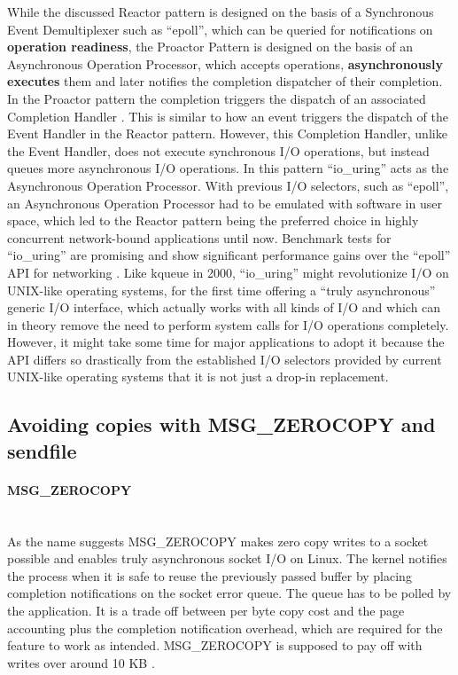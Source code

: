 While the discussed Reactor pattern is designed on the basis of a Synchronous Event Demultiplexer such as “epoll”, which can be queried for notifications on \textbf{operation readiness}, the Proactor Pattern is designed on the basis of an Asynchronous Operation Processor, which accepts operations, \textbf{asynchronously executes} them and later notifies the completion dispatcher of their completion. In the Proactor pattern the completion triggers the dispatch of an associated Completion Handler \cite{schmidt:proactor}. This is similar to how an event triggers the dispatch of the Event Handler in the Reactor pattern. However, this Completion Handler, unlike the Event Handler, does not execute synchronous I/O operations, but instead queues more asynchronous I/O operations. In this pattern “io\_uring” acts as the Asynchronous Operation Processor. With previous I/O selectors, such as “epoll”, an Asynchronous Operation Processor had to be emulated with software in user space, which led to the Reactor pattern being the preferred choice in highly concurrent network-bound applications until now. \newline
Benchmark tests for “io\_uring” are promising and show significant performance gains over the “epoll” API for networking \cite{github:io_uring_bench}. Like kqueue in 2000, “io\_uring” might revolutionize I/O on UNIX-like operating systems, for the first time offering a “truly asynchronous” generic I/O interface, which actually works with all kinds of I/O and which can in theory remove the need to perform system calls for I/O operations completely.
However, it might take some time for major applications to adopt it because the API differs so drastically from the established I/O selectors provided by current UNIX-like operating systems that it is not just a drop-in replacement.

\subsection{Avoiding copies with MSG\_ZEROCOPY and sendfile}
\paragraph{MSG\_ZEROCOPY}\mbox{}\\
As the name suggests MSG\_ZEROCOPY makes zero copy writes to a socket possible and enables truly asynchronous socket I/O on Linux. The kernel notifies the process when it is safe to reuse the previously passed buffer by placing completion notifications on the socket error queue. The queue has to be polled by the application. It is a trade off between per byte copy cost and the page accounting plus the completion notification overhead, which are required for the feature to work as intended. MSG\_ZEROCOPY is supposed to pay off with writes over around 10 KB \cite{linux:zerocopy}.
